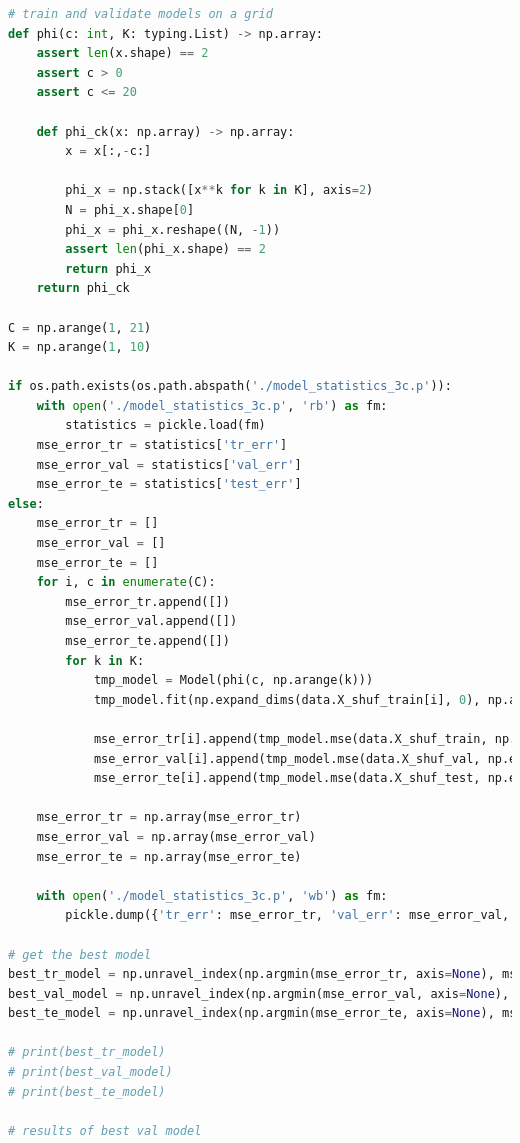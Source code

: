 \documentclass{article}
\begin{document}
\begin{lstlisting}[language=Python]
# train and validate models on a grid
def phi(c: int, K: typing.List) -> np.array:
    assert len(x.shape) == 2
    assert c > 0
    assert c <= 20
    
    def phi_ck(x: np.array) -> np.array:
        x = x[:,-c:]
    
        phi_x = np.stack([x**k for k in K], axis=2)
        N = phi_x.shape[0]
        phi_x = phi_x.reshape((N, -1))
        assert len(phi_x.shape) == 2
        return phi_x
    return phi_ck

C = np.arange(1, 21)
K = np.arange(1, 10)

if os.path.exists(os.path.abspath('./model_statistics_3c.p')):
    with open('./model_statistics_3c.p', 'rb') as fm:
        statistics = pickle.load(fm)
    mse_error_tr = statistics['tr_err']
    mse_error_val = statistics['val_err']
    mse_error_te = statistics['test_err']
else:
    mse_error_tr = []
    mse_error_val = []
    mse_error_te = []
    for i, c in enumerate(C):
        mse_error_tr.append([])
        mse_error_val.append([])
        mse_error_te.append([])
        for k in K:
            tmp_model = Model(phi(c, np.arange(k)))
            tmp_model.fit(np.expand_dims(data.X_shuf_train[i], 0), np.array([[data.y_shuf_train[i]]]))

            mse_error_tr[i].append(tmp_model.mse(data.X_shuf_train, np.expand_dims(data.y_shuf_train, -1)))
            mse_error_val[i].append(tmp_model.mse(data.X_shuf_val, np.expand_dims(data.y_shuf_val, -1)))
            mse_error_te[i].append(tmp_model.mse(data.X_shuf_test, np.expand_dims(data.y_shuf_test, -1)))

    mse_error_tr = np.array(mse_error_tr)
    mse_error_val = np.array(mse_error_val)
    mse_error_te = np.array(mse_error_te)
    
    with open('./model_statistics_3c.p', 'wb') as fm:
        pickle.dump({'tr_err': mse_error_tr, 'val_err': mse_error_val, 'test_err': mse_error_te}, fm)
        
# get the best model
best_tr_model = np.unravel_index(np.argmin(mse_error_tr, axis=None), mse_error_tr.shape)
best_val_model = np.unravel_index(np.argmin(mse_error_val, axis=None), mse_error_val.shape)
best_te_model = np.unravel_index(np.argmin(mse_error_te, axis=None), mse_error_te.shape)

# print(best_tr_model)
# print(best_val_model)
# print(best_te_model)

# results of best val model


\end{lstlisting}
\end{document}
